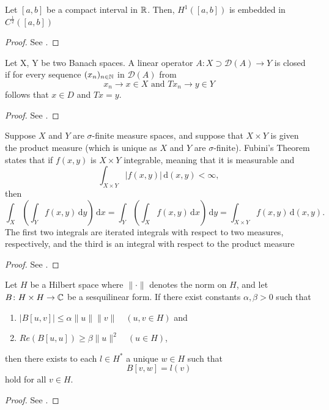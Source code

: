 \begin{atheorem} \label{embhc}
	Let $[a, b]$ be a compact interval in $\mathbb{R}$. Then, $H^{1}([a, b])$ is embedded in $C^{\frac{1}{2}}([a, b])$
	
	\begin{proof}
		See \cite[p. 269]{evans1998partial}.
	\end{proof}
\end{atheorem}

\begin{atheorem}
	Let X, Y be two Banach spaces. A linear operator $A \colon X \supset \mathcal{D}(A)  \rightarrow Y$ is closed if for every sequence $(x_n)_{n \in \mathbb{N}}$ in $\mathcal{D}(A)$ from
	\[ x_{n} \rightarrow x \in X \text{ and } Tx_{n} \rightarrow y \in Y \]
	follows that $x \in D$ and $Tx = y$.

	\begin{proof}
		 See \cite[p. 156]{werner2006funkana}.
	\end{proof}
\end{atheorem}	

\begin{atheorem}
	Suppose $X$ and $Y$ are $\sigma$-finite measure spaces, and suppose that $X \times Y$ is given the product measure (which is unique as $X$ and $Y$ are $\sigma$-finite). Fubini's Theorem states that if $f(x,y)$ is $X \times Y$ integrable, meaning that it is measurable and
		\[  \int_{X\times Y} |f(x,y)|\,\text{d}(x,y)<\infty, \]
	then
		\[ \int_X\left(\int_Y f(x,y)\,\text{d}y\right)\,\text{d}x=\int_Y\left(\int_X f(x,y)\,\text{d}x\right)\,\text{d}y=\int_{X\times Y} f(x,y)\,\text{d}(x,y). \]
	The first two integrals are iterated integrals with respect to two measures, respectively, and the third is an integral with respect to the product measure

	\begin{proof}
		See \cite[p. 514]{werner2006funkana}.
	\end{proof}
\end{atheorem}

\begin{atheorem} \label{athm:lm}
	Let $H$ be a Hilbert space where $\| \cdot \|$ denotes the norm on $H$, and let $B \colon H \times H \rightarrow \mathbb{C}$ be a sesquilinear form. If there exist constants $\alpha, \beta > 0$ such that
	\begin{enumerate}[label=\alph*\upshape)]
		\item $\left| B[u, v] \right| \leq \alpha \| u \| \|v \| \quad (u, v \in H)$ and
		\item $Re(B[u,u]) \geq \beta \|u\|^{2} \quad (u \in H)$,
	\end{enumerate}
	then there exists to each $l \in H^{*}$ a unique $w \in H$ such that
		\[ B[v, w] = l(v) \]
	hold for all $v \in H$.
		
	\begin{proof}
		See \cite[Amd to problem 51]{plum2015dglhr}.
	\end{proof}
\end{atheorem}

